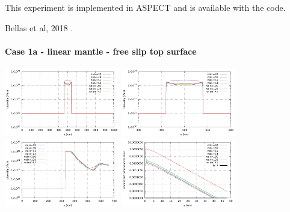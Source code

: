 This experiment is implemented in ASPECT and is available with the code. 

\Literature Bellas et al, 2018 \cite{bezb18}.

\newpage
\paragraph{Case 1a - linear mantle - free slip top surface} 

\begin{center}
\includegraphics[width=5cm]{python_codes/fieldstone_26/results/case1a/horizontal.pdf}
\includegraphics[width=5cm]{python_codes/fieldstone_26/results/case1a/horizontal_zoom.pdf}\\
\includegraphics[width=5cm]{python_codes/fieldstone_26/results/case1a/vertical.pdf}
\includegraphics[width=5cm]{python_codes/fieldstone_26/results/case1a/residual.pdf}
\end{center}


